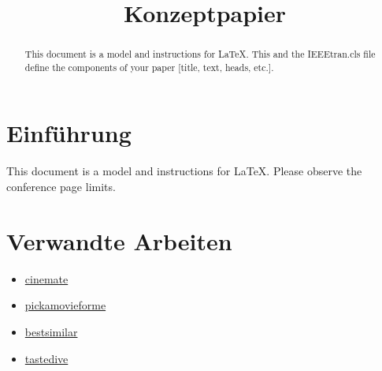 \documentclass[conference]{IEEEtran}
\begin{document}
\title{Konzeptpapier}

\author{
	\and

	\and
	
	\and
	
	\and
	
}

\maketitle

\begin{abstract}
This document is a model and instructions for \LaTeX.
This and the IEEEtran.cls file define the components of your paper [title, text, heads, etc.].
\end{abstract}


\section{Einführung}

This document is a model and instructions for \LaTeX.
Please observe the conference page limits.




\section{Verwandte Arbeiten}

\begin{itemize}
	\item \href{https://cinemate.me/}{cinemate}
	\item \href{https://pickamovieforme.com/}{pickamovieforme}
	\item \href{https://bestsimilar.com/}{bestsimilar}
	\item \href{https://tastedive.com/movies}{tastedive}
\end{itemize}
\end{document}
